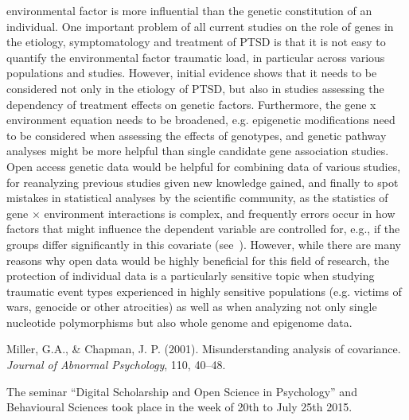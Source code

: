 \documentclass[a4paper,USenglish]{dagrep}
\begin{document}
environmental factor is more influential than the genetic constitution of an
individual. One important problem of all current studies on the role of genes in
the etiology, symptomatology and treatment of PTSD is that it is not easy to
quantify the environmental factor traumatic load, in particular across various
populations and studies. However, initial evidence shows that it needs to be
considered not only in the etiology of PTSD, but also in studies assessing the
dependency of treatment effects on genetic factors. Furthermore, the gene x
environment equation needs to be broadened, e.g. epigenetic modifications need
to be considered when assessing the effects of genotypes, and genetic pathway
analyses might be more helpful than single candidate gene association studies. 
Open access genetic data would be helpful for combining data of various studies,
for reanalyzing previous studies given new knowledge gained, and finally to spot
mistakes in statistical analyses by the scientific community, as the statistics
of gene × environment interactions is complex, and frequently errors occur in
how factors that might influence the dependent variable are controlled for,
e.g., if the groups differ significantly in this covariate (see~\cite{MillerChapman}). However, while there are many reasons why open data would be highly
beneficial for this field of research, the protection of individual data is a
particularly sensitive topic when studying traumatic event types experienced in
highly sensitive populations (e.g. victims of wars, genocide or other
atrocities) as well as when analyzing not only single nucleotide polymorphisms
but also whole genome and epigenome data. 

\begin{thebibliography}{0}
Miller, G.A., \& Chapman, J. P. (2001). Misunderstanding analysis of covariance.  \textit{Journal of Abnormal Psychology}, 110, 40–48.
\end{thebibliography}
  


{}
\license
{}
The seminar ``Digital Scholarship and Open Science in Psychology'' and 
Behavioural Sciences took place in the week of 20th to July 25th 2015.
\end{document}

